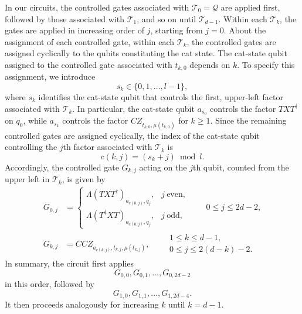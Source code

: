 \documentclass[
 reprint,
 amsmath,amssymb,
 pra,superscriptaddress, nofootinbib
]{revtex4-2}
\theoremstyle{definition}
\theoremstyle{plain}
\begin{document}
In our circuits, the controlled gates associated with $\mathcal{T}_0=\mathcal{Q}$ are applied first, followed by those associated with $\mathcal{T}_1$, and so on until $\mathcal{T}_{d-1}$. Within each $\mathcal{T}_k$, the gates are applied in increasing order of $j$, starting from $j=0$.
About the assignment of each controlled gate, within each $\mathcal{T}_k$, the controlled gates are assigned cyclically to the qubits constituting the cat state. The cat-state qubit assigned to the controlled gate associated with $t_{k,0}$ depends on $k$. To specify this assignment, we introduce
\begin{equation}
    s_k\in\{0,1,\ldots,l-1\},
\end{equation}
where $s_k$ identifies the cat-state qubit that controls the first, upper-left factor associated with $\mathcal{T}_k$. In particular, the cat-state qubit $a_{s_0}$ controls the factor $TXT^\dagger$ on $q_0$, while $a_{s_k}$ controls the factor $CZ_{t_{k,0},\mu(t_{k,0})}$ for $k\geq1$.
Since the remaining controlled gates are assigned cyclically, the index of the cat-state qubit controlling the $j$th factor associated with $\mathcal{T}_k$ is 
\begin{equation}
    c(k,j)=(s_k+j)\bmod l.
\end{equation}
Accordingly, the controlled gate $G_{k,j}$ acting on the $j$th qubit, counted from the upper left in $\mathcal{T}_k$, is given by
\begin{align}
    G_{0,j}
    &=
    \begin{cases}
        \Lambda(TXT^\dagger)_{a_{c(0,j)},q_j}, & j\ \text{even},\\
        \Lambda(T^\dagger XT)_{a_{c(0,j)},q_j}, & j\ \text{odd},
    \end{cases}
    \qquad 0\leq j\leq2d-2,
    \\
    G_{k,j}
    &=CCZ_{a_{c(k,j)},t_{k,j},\mu(t_{k,j})},
    \qquad
    \begin{matrix}
        1\leq k\leq d-1,\\
        0\leq j\leq2(d-k)-2.
    \end{matrix}
\end{align}
In summary, the circuit first applies 
\begin{equation}
    G_{0,0},G_{0,1},\ldots,G_{0,2d-2}
\end{equation}
 in this order, followed by
 \begin{equation}
    G_{1,0},G_{1,1},\ldots,G_{1,2d-4}.
\end{equation}
It then proceeds analogously for increasing $k$ until $k=d-1$.
\end{document}
